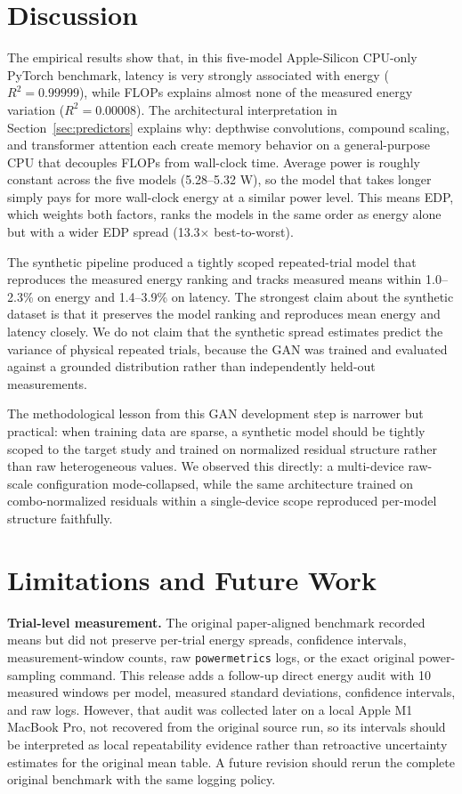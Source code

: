 \documentclass[conference]{IEEEtran}
\begin{document}
\section{Discussion}
The empirical results show that, in this five-model Apple-Silicon CPU-only
PyTorch benchmark, latency is very strongly associated with energy
($R^2 = 0.99999$), while FLOPs explains almost none of the measured energy
variation ($R^2 = 0.00008$). The architectural
interpretation in Section~\ref{sec:predictors} explains why: depthwise
convolutions, compound scaling, and transformer attention each create memory
behavior on a general-purpose CPU that decouples FLOPs from wall-clock time.
Average power is roughly constant across the five models (5.28--5.32 W), so
the model that takes longer simply pays for more wall-clock energy at a
similar power level. This means EDP, which weights both factors, ranks the
models in the same order as energy alone but with a wider EDP spread
(13.3$\times$ best-to-worst).

The synthetic pipeline produced a tightly scoped repeated-trial model that
reproduces the measured energy ranking and tracks measured means within
1.0--2.3\% on energy and 1.4--3.9\% on latency. The strongest claim about
the synthetic dataset is that it preserves the model ranking and reproduces
mean energy and latency closely. We do not claim that the synthetic spread
estimates predict the variance of physical repeated trials, because the GAN
was trained and evaluated against a grounded distribution rather than
independently held-out measurements.

The methodological lesson from this GAN development step is narrower but
practical: when training data are sparse, a synthetic model should be tightly
scoped to the target study and trained on normalized residual structure rather
than raw heterogeneous values. We observed this directly: a multi-device
raw-scale configuration mode-collapsed, while the same architecture trained
on combo-normalized residuals within a single-device scope reproduced
per-model structure faithfully.

\section{Limitations and Future Work}
\label{sec:limitations}
\textbf{Trial-level measurement.} The original paper-aligned benchmark
recorded means but did not preserve per-trial energy spreads, confidence
intervals, measurement-window counts, raw \texttt{powermetrics} logs, or the
exact original power-sampling command. This release adds a follow-up direct
energy audit with 10 measured windows per model, measured standard deviations,
confidence intervals, and raw logs. However, that audit was collected later on
a local Apple M1 MacBook Pro, not recovered from the original source run, so
its intervals should be interpreted as local repeatability evidence rather
than retroactive uncertainty estimates for the original mean table. A future
revision should rerun the complete original benchmark with the same logging
policy.
\end{document}
